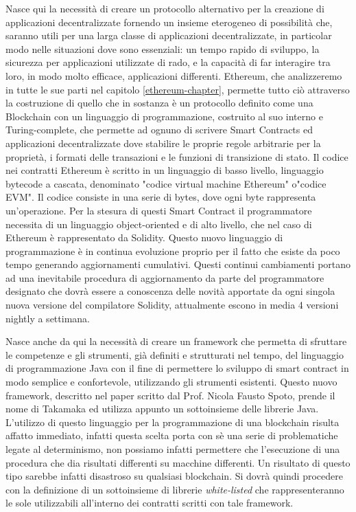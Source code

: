 Nasce qui la necessità di creare un protocollo alternativo per la creazione di applicazioni decentralizzate fornendo un insieme eterogeneo di possibilità che, saranno utili per una larga classe di applicazioni decentralizzate, in particolar modo nelle situazioni dove sono essenziali: un tempo rapido di sviluppo, la sicurezza per applicazioni utilizzate di rado, e la capacità di far interagire tra loro, in modo molto efficace, applicazioni differenti. Ethereum, che analizzeremo in tutte le sue parti nel capitolo \ref{ethereum-chapter}, permette tutto ciò attraverso la costruzione di quello che in sostanza è un protocollo definito come una Blockchain con un linguaggio di programmazione, costruito al suo interno e Turing-complete, che permette ad ognuno di scrivere Smart Contracts ed applicazioni decentralizzate dove stabilire le proprie regole arbitrarie per la proprietà, i formati delle transazioni e le funzioni di transizione di stato. Il codice nei contratti Ethereum è scritto in un linguaggio di basso livello, linguaggio bytecode a cascata, denominato "codice virtual machine Ethereum" o"codice EVM". Il codice consiste in una serie di bytes, dove ogni byte rappresenta un'operazione. Per la stesura di questi Smart Contract il programmatore necessita di un linguaggio object-oriented e di alto livello, che nel caso di Ethereum è rappresentato da Solidity. Questo nuovo linguaggio di programmazione è in continua evoluzione proprio per il fatto che esiste da poco tempo generando aggiornamenti cumulativi. Questi continui cambiamenti portano ad una inevitabile procedura di aggiornamento da parte del programmatore designato che dovrà essere a conoscenza delle novità apportate da ogni singola nuova versione del compilatore Solidity, attualmente escono in media 4 versioni nightly a settimana. 

Nasce anche da qui la necessità di creare un framework che permetta di sfruttare le competenze e gli strumenti, già definiti e strutturati nel tempo, del linguaggio di programmazione Java con il fine di permettere lo sviluppo di smart contract in modo semplice e confortevole, utilizzando gli strumenti esistenti. Questo nuovo framework, descritto nel paper \cite{paper-takamaka:spoto} scritto dal Prof. Nicola Fausto Spoto, prende il nome di Takamaka ed utilizza appunto un sottoinsieme delle librerie Java. L'utilizzo di questo linguaggio per la programmazione di una blockchain risulta affatto immediato, infatti questa scelta porta con sè una serie di problematiche legate al determinismo, non possiamo infatti permettere che l'esecuzione di una procedura che dia risultati differenti su macchine differenti. Un risultato di questo tipo sarebbe infatti disastroso su qualsiasi blockchain. Si dovrà quindi procedere con la definizione di un sottoinsieme di librerie \textit{white-listed} che rappresenteranno le sole utilizzabili all'interno dei contratti scritti con tale framework.

